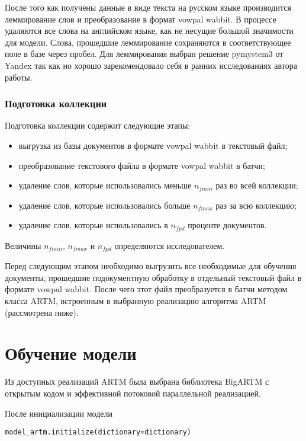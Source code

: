 После того как получены данные в виде текста на русском языке производится леммирование слов и преобразование в формат vowpal wabbit. В процессе удаляются все слова на английском языке, как не несущие большой значимости для модели. Слова, прошедшие леммирование сохраняются в соответствующее поле в базе через пробел. Для леммирования выбран решение pymystem3 от Yandex так как но хорошо зарекомендовало себя в ранних исследованиях автора работы.

\subsubsection{Подготовка коллекции}

Подготовка коллекции содержит следующие этапы:

\begin{itemize}
    \item выгрузка из базы документов в формате vowpal wabbit в текстовый файл;
    \item преобразование текстового файла в формате vowpal wabbit в батчи;
    \item удаление слов, которые использовались меньше $n_{fmin}$ раз во всей коллекции;
    \item удаление слов, которые использовались больше $n_{fmax}$ раз за всю коллекцию;
    \item удаление слов, которые использовались в $n_{fpd}$ проценте документов.
\end{itemize}
Величины $n_{fmin}$, $n_{fmax}$ и $n_{fpd}$ определяются исследователем.

Перед следующим этапом необходимо выгрузить все необходимые для обучения документы, прошедшие подокументную обработку в отдельный текстовый файл в формате vowpal wabbit. После чего этот файл преобразуется в батчи методом класса ARTM, встроенным в выбранную реализацию алгоритма ARTM (рассмотрена ниже).

\section{Обучение модели}

Из доступных реализаций ARTM была выбрана библиотека BigARTM с открытым кодом и эффективной потоковой параллельной реализацией. 

После инициализации модели

\begin{lstlisting}
model_artm.initialize(dictionary=dictionary)
\end{lstlisting}

